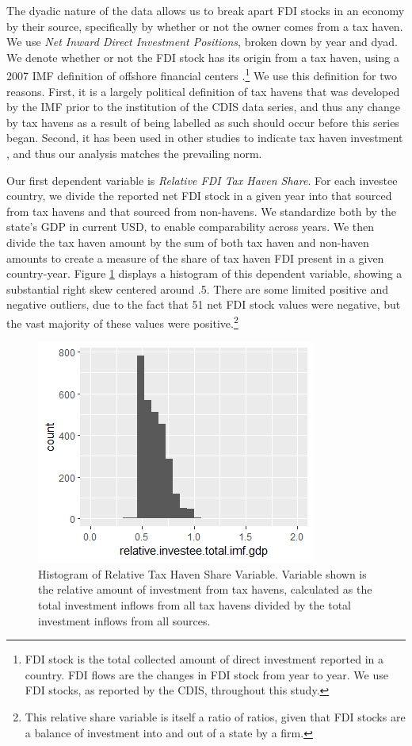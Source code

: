 \documentclass[11pt, titlepage]{article} %
\begin{document}
The dyadic nature of the data allows us to break apart FDI stocks in an economy by their source, specifically by whether or not the owner comes from a tax haven. We use \textit{Net Inward Direct Investment Positions}, broken down by year and dyad. We denote whether or not the FDI stock has its origin from a tax haven, using a 2007 IMF definition of offshore financial centers \parencite{zoromeConceptOffshoreFinancial2007}.\footnote{FDI stock is the total collected amount of direct investment reported in a country. FDI flows are the changes in FDI stock from year to year. We use FDI stocks, as reported by the CDIS, throughout this study.} We use this definition for two reasons. First, it is a largely political definition of tax havens that was developed by the IMF prior to the institution of the CDIS data series, and thus any change by tax havens as a result of being labelled as such should occur before this series began. Second, it has been used in other studies to indicate tax haven investment \parencite{andersenEliteCaptureForeign2020}, and thus our analysis matches the prevailing norm. 

Our first dependent variable is \textit{Relative FDI Tax Haven Share}. For each investee country, we divide the reported net FDI stock in a given year into that sourced from tax havens and that sourced from non-havens. We standardize both by the state's GDP in current USD, to enable comparability across years. We then divide the tax haven amount by the sum of both tax haven and non-haven amounts to create a measure of the share of tax haven FDI present in a given country-year. Figure \ref{fig:dv1histo} displays a histogram of this dependent variable, showing a substantial right skew centered around .5. There are some limited positive and negative outliers, due to the fact that 51 net FDI stock values were negative, but the vast majority of these values were positive.\footnote{This relative share variable is itself a ratio of ratios, given that FDI stocks are a balance of investment into and out of a state by a firm.} 

	\begin{figure}
    \centering
		\includegraphics[scale=1]{dv1histo.png}
		\caption{Histogram of Relative Tax Haven Share Variable. Variable shown is the relative amount of investment from tax havens, calculated as the total investment inflows from all tax havens divided by the total investment inflows from all sources.}
		\label{fig:dv1histo}
	\end{figure}
\end{document}
